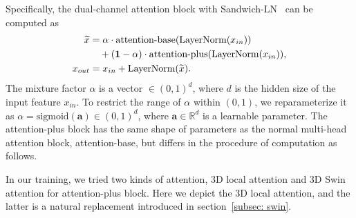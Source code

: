 Specifically, the dual-channel attention block with Sandwich-LN~\cite{ding2021cogview} can be computed as
\begin{align}
\widetilde{x} & = \mathbf{{\alpha}} \cdot \text{attention-base}(\text{LayerNorm}(x_{in}))\notag \\ &\quad+ (\mathbf{1-{\alpha}}) \cdot \text{attention-plus}(\text{LayerNorm}(x_{in})), \label{eq-alpha} \\
x_{out} & = x_{in} + \text{LayerNorm}(\widetilde{x}).
\end{align}
The mixture factor $\alpha$ is a vector $\in {(0,1)}^{d}$, where $d$ is the hidden size of the input feature $x_{in}$. To restrict the range of $\alpha$ within $(0,1)$, we reparameterize it as $\alpha = \text{sigmoid}(\mathbf{a}) \in {(0,1)}^{d}$, where $\mathbf{a}\in \mathbb{R}^d$ is a learnable parameter. 
The attention-plus block has the same shape of parameters as the normal multi-head attention block, attention-base, but differs in the  procedure of computation as follows.

In our training, we tried two kinds of attention, 3D local attention and 3D Swin~\cite{liu2021swin} attention for attention-plus block. Here we depict the 3D local attention, and the latter is a natural replacement introduced in section~\ref{subsec: swin}.

